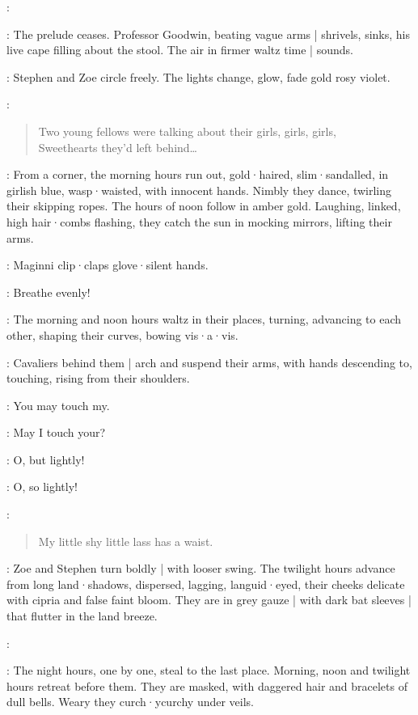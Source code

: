 \Maginni:

:
The prelude ceases.
Professor Goodwin,
beating vague arms |
shrivels,
sinks,
his live cape filling about the stool.
The air in firmer waltz time |
sounds.

:
Stephen and Zoe circle freely.
The lights change,
%
glow,
fade gold rosy violet.

\Pianola[2]:
\begin{verse}
    Two young fellows were talking about their girls, girls, girls,\\
    Sweethearts they'd left behind…
\end{verse}

:
From a corner,
the morning hours run out,
gold·haired,
slim·sandalled,
in girlish blue,
wasp·waisted,
with innocent hands.
Nimbly they dance,
twirling their skipping ropes.
The hours of noon follow in amber gold.
Laughing,
linked,
high hair·combs flashing,
they catch the sun in mocking mirrors,
lifting their arms.

:
Maginni clip·claps glove·silent hands.

\Maginni:
Breathe evenly!

:
The morning and noon hours waltz in their places,
turning,
advancing to each other,
shaping their curves,
bowing vis·a·vis.

:
Cavaliers behind them |
arch and suspend their arms,
with hands descending to,
touching,
rising from their shoulders.

\Hours:
You may touch my.

\Cavaliers:
May I touch your?

\Hours:
O,
but lightly!

\Cavaliers:
O,
so lightly!

\Pianola:
\begin{verse}
    My little shy little lass has a waist.
\end{verse}

:
Zoe and Stephen turn boldly |
with looser swing.
The twilight hours advance from long land·shadows,
dispersed,
lagging,
languid·eyed,
their cheeks delicate with cipria and false faint bloom.
They are in grey gauze |
with dark bat sleeves |
that flutter in the land breeze.

\Maginni[2]:

:
The night hours,
one by one,
steal to the last place.
Morning,
noon and twilight hours retreat before them.
They are masked,
with daggered hair and bracelets of dull bells.
Weary they curch·ycurchy under veils.

